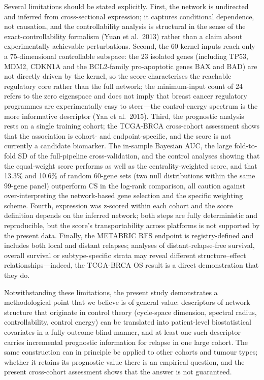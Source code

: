 \documentclass[12pt]{article}
\begin{document}
Several limitations should be stated explicitly. First, the network is
undirected and inferred from cross-sectional expression; it captures
conditional dependence, not causation, and the controllability analysis is
structural in the sense of the exact-controllability formalism (Yuan et al.\
2013) rather than a claim about experimentally achievable perturbations.
Second, the 60 kernel inputs reach only a 75-dimensional controllable
subspace: the 23 isolated genes (including TP53, MDM2, CDKN1A and the
BCL2-family pro-apoptotic genes BAX and BAD) are not directly driven by the
kernel, so the score characterises the reachable regulatory core rather than
the full network; the minimum-input count of 24 refers to the zero
eigenspace and does not imply that breast cancer regulatory programmes are
experimentally easy to steer---the control-energy spectrum is the more
informative descriptor (Yan et al.\ 2015). Third, the prognostic analysis
rests on a single training cohort; the TCGA-BRCA cross-cohort assessment shows
that the association is cohort- and endpoint-specific, and the score is not
currently a candidate biomarker. The in-sample Bayesian AUC, the large
fold-to-fold SD of the full-pipeline cross-validation, and the control
analyses showing that the equal-weight score performs as well as the
centrality-weighted score, and that 13.3\% and 10.6\% of random 60-gene
sets (two null distributions within the same 99-gene panel) outperform CS
in the log-rank comparison, all caution against
over-interpreting the network-based gene selection and the specific
weighting scheme. Fourth, expression was z-scored within each cohort and the
score definition depends on the inferred network; both steps are fully
deterministic and reproducible, but the score's transportability across
platforms is not supported by the present data. Finally, the METABRIC RFS
endpoint is registry-defined and includes both local and distant relapses;
analyses of distant-relapse-free survival, overall survival or
subtype-specific strata may reveal different structure--effect
relationships---indeed, the TCGA-BRCA OS result is a direct demonstration
that they do.

Notwithstanding these limitations, the present study demonstrates a
methodological point that we believe is of general value: descriptors of
network structure that originate in control theory (cycle-space dimension,
spectral radius, controllability, control energy) can be translated into
patient-level biostatistical covariates in a fully outcome-blind manner, and
at least one such descriptor carries incremental prognostic information for
relapse in one large cohort. The same construction can in principle be
applied to other cohorts and tumour types; whether it retains its prognostic
value there is an empirical question, and the present cross-cohort
assessment shows that the answer is not guaranteed.
\end{document}
